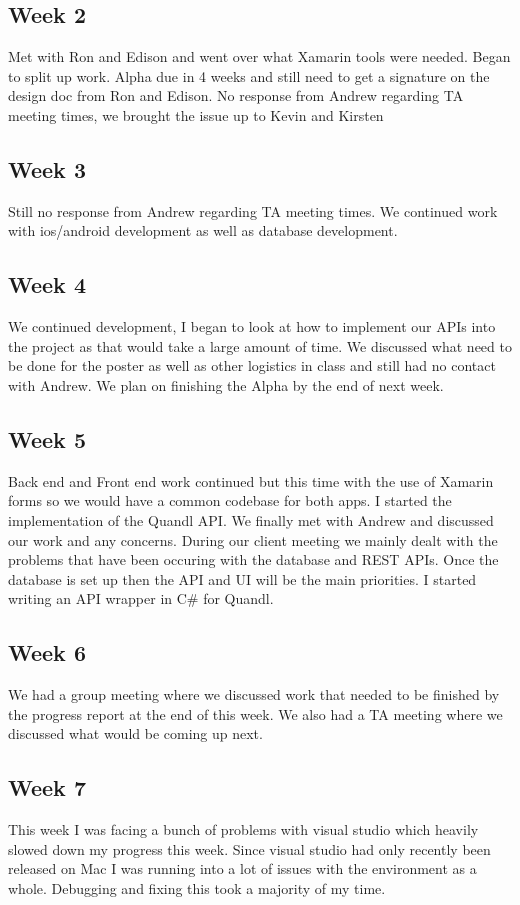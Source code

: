 \documentclass[onecolumn, draftclsnofoot,10pt, compsoc]{IEEEtran}
\begin{document}
    \subsection{Week 2}
    Met with Ron and Edison and went over what Xamarin tools were needed. Began to split up work. Alpha due in 4 weeks and still need to get a signature on the design doc from Ron and Edison. No response from Andrew regarding TA meeting times, we brought the issue up to Kevin and Kirsten
    
    \subsection{Week 3} 
    Still no response from Andrew regarding TA meeting times. We continued work with ios/android development as well as database development.
    
    \subsection{Week 4}
    We continued development, I began to look at how to implement our APIs into the project as that would take a large amount of time. We discussed what need to be done for the poster as well as other logistics in class and still had no contact with Andrew. We plan on finishing the Alpha by the end of next week.
    
    \subsection{Week 5}
    Back end and Front end work continued but this time with the use of Xamarin forms so we would have a common codebase for both apps. I started the implementation of the Quandl API. We finally met with Andrew and discussed our work and any concerns. During our client meeting we mainly dealt with the problems that have been occuring with the database and REST APIs. Once the database is set up then the API and UI will be the main priorities. I started writing an API wrapper in C# for Quandl.
    
    \subsection{Week 6}
    We had a group meeting where we discussed work that needed to be finished by the progress report at the end of this week. We also had a TA meeting where we discussed what would be coming up next. 
    
    \subsection{Week 7} 
    This week I was facing a bunch of problems with visual studio which heavily slowed down my progress this week. Since visual studio had only recently been released on Mac I was running into a lot of issues with the environment as a whole. Debugging and fixing this took a majority of my time. 
    
\end{document}
